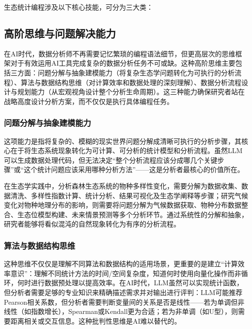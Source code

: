 \documentclass[
  twoside,12pt,fontset=none]{ctexbook}
\begin{document}
生态统计编程涉及以下核心技能，可分为三大类：

\hypertarget{ux9ad8ux9636ux601dux7ef4ux4e0eux95eeux9898ux89e3ux51b3ux80fdux529b}{%
\subsection{高阶思维与问题解决能力}\label{ux9ad8ux9636ux601dux7ef4ux4e0eux95eeux9898ux89e3ux51b3ux80fdux529b}}

在AI时代，数据分析师不再需要记忆繁琐的编程语法细节，但更高层次的思维框架对于有效运用AI工具完成复杂的数据分析任务不可或缺。这种高阶思维主要包括三方面：问题分解与抽象建模能力（将复杂生态学问题转化为可执行的分析流程）、算法与数据结构思维（对计算效率和数据处理的深刻理解）、数据分析流程设计与规划能力（从宏观视角设计整个分析生命周期）。这三种能力确保研究者站在战略高度设计分析方案，而不仅仅是执行具体编程任务。

\hypertarget{ux95eeux9898ux5206ux89e3ux4e0eux62bdux8c61ux5efaux6a21ux80fdux529b}{%
\subsubsection{问题分解与抽象建模能力}\label{ux95eeux9898ux5206ux89e3ux4e0eux62bdux8c61ux5efaux6a21ux80fdux529b}}

这项能力是指将复杂的、模糊的现实世界问题分解成清晰可执行的分析步骤，其核心在于将生态系统现象转化为可计算、可分析的统计模型和分析流程。虽然LLM可以生成数据处理代码，但无法决定``整个分析流程应该分成哪几个关键步骤''或``这个统计问题应该采用哪种分析方法''------这是分析者最核心的价值所在。

在生态学实践中，分析森林生态系统的物种多样性变化，需要分解为数据收集、数据清洗、多样性指数计算、统计分析、结果可视化及生态学阐释等步骤；研究气候变化对物种地理分布的影响，则需要将问题分解为气候数据获取、物种分布数据整合、生态位模型构建、未来情景预测等多个分析环节。通过系统性的分解和抽象，研究者能够将看似混沌的自然现象转化为有序的分析流程。

\hypertarget{ux7b97ux6cd5ux4e0eux6570ux636eux7ed3ux6784ux601dux7ef4}{%
\subsubsection{算法与数据结构思维}\label{ux7b97ux6cd5ux4e0eux6570ux636eux7ed3ux6784ux601dux7ef4}}

这种思维不仅仅是理解不同算法和数据结构的适用场景，更重要的是建立``计算效率意识''：理解不同统计方法的时间/空间复杂度，知道何时使用向量化操作而非循环，何时进行数据预处理以提高效率。在AI时代，LLM虽然可以实现统计函数，但分析者需要足够的专业知识来精确描述需求并对输出进行评判：LLM可能推荐Pearson相关系数，但分析者需要判断变量间的关系是否是线性------若为单调但非线性（如指数增长），Spearman或Kendall更为合适；若为非单调（如U型），则需要距离相关或交互信息。这种批判性思维是AI难以替代的。
\end{document}
